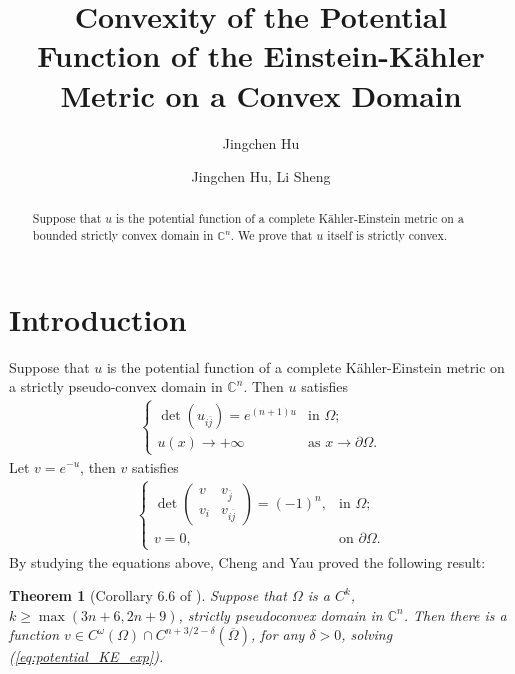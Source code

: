 \documentclass{article}
\author{Jingchen Hu}
\title{Convexity of the Potential Function of the Einstein-K\"ahler Metric on a Convex Domain}
\author{Jingchen Hu, Li Sheng}
\numberwithin{equation}{section}
\newtheorem*{oldtheorem}{Theorem}
\newcommand{\EC}{\mathbb{C}}
\newcommand{\jbar}{{\overline{j}}}
\begin{document}
\maketitle

\begin{abstract}
Suppose that $u$ is the potential function of a complete K\"ahler-Einstein metric on a bounded strictly convex domain in $\EC^n$. We prove that $u$ itself is strictly convex.
\end{abstract}

\section{Introduction}
Suppose that $u$ is the potential function of a complete K\"ahler-Einstein metric on a strictly pseudo-convex domain in $\EC^n$. Then $u$ satisfies
\begin{align}
	\label{eq:potential_KE}
	\left\{
 	\begin{array}{cc}
 	\det(u_{i\jbar})=e^{(n+1)u}& \text{in\ \ } \Omega;\\
 	u(x)\rightarrow+\infty & \text{as\ \ }x\rightarrow \partial\Omega.
 \end{array}
	\right.
\end{align}
Let $v=e^{-u}$, then $v$ satisfies
\begin{align}
	\label{eq:potential_KE_exp}
	\left\{
	\begin{array}{cc}
		\det
		\left(
		\begin{array}{cc}
			v& v_{\jbar}\\
			v_i& v_{i\jbar}
			\end{array}
		\right)=(-1)^n, & \text{in\ \ }\Omega;\\
		v=0,& \text{on \ \ }\partial\Omega.
	\end{array}
	\right.
\end{align}
By studying the equations above, Cheng and Yau\cite{ChengYau_80_KahlerMetric} proved the following result:
\begin{oldtheorem}[Corollary 6.6 of \cite{ChengYau_80_KahlerMetric}]
	Suppose that $\Omega$ is a $C^k$, $k\geq \max(3n+6,2n+9)$, strictly pseudoconvex domain in $\EC^n$. Then there is a function $v\in C^{\omega}(\Omega)\cap C^{n+3/2-\delta}(\overline{\Omega})$, for any $\delta>0$, solving (\ref{eq:potential_KE_exp}).
\end{oldtheorem}
\end{document}
